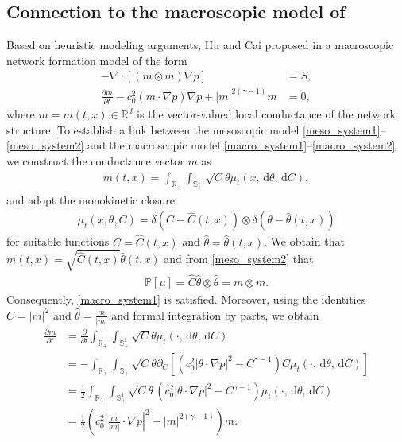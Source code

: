 \documentclass{article}
\numberwithin{equation}{section}
\def\[{\begin{eqnarray*}}
\def\]{\end{eqnarray*}}
\def\d{\,\mathrm{d}}
\begin{document}
\subsection{Connection to the macroscopic model of \cite{hu2013optimization}}
Based on heuristic modeling arguments, Hu and Cai proposed in \cite{hu2013optimization} a macroscopic network formation model of the form
\begin{align}
   -\nabla \cdot [(m\otimes m)\nabla p] &= S,\label{macro_system1}\\
   \frac{\partial m}{\partial t} - c_0^2 (m\cdot \nabla p)\nabla p + |m|^{2(\gamma-1)}m &= 0,\label{macro_system2}
\end{align}
where $m=m(t,x)\in \mathbb{R}^d$ is the vector-valued local conductance of the network structure.
To establish a link between the mesoscopic model \eqref{meso_system1}--\eqref{meso_system2}
and the macroscopic model \eqref{macro_system1}--\eqref{macro_system2} we construct the conductance vector $m$ as
\begin{align*}
   m(t,x) = \int_{\mathbb{R}_+}\int_{\mathbb{S}_+^1} \sqrt{C}\theta \mu_t(x,  \d\theta,\d C),
\end{align*}
and adopt the monokinetic closure
\begin{align*}
   \mu_t(x,\theta,C) = \delta(C-\hat{C}(t,x)) \otimes \delta(\theta-\hat{\theta}(t,x))
\end{align*}
for suitable functions $\hat{C}=\hat{C}(t,x)$ and $\hat{\theta}=\hat{\theta}(t,x)$.
We obtain that $m(t,x)=\sqrt{\hat{C}(t,x)}\hat{\theta}(t,x)$ and from \eqref{meso_system2} that
\[
    \mathbb{P}[\mu] =  \hat{C} \hat{\theta}\otimes\hat{\theta} = m\otimes m.
\]
Consequently, \eqref{macro_system1} is satisfied. 
Moreover, using the identities $\hat{C}=|m|^2$ and $\hat{\theta}=\frac{m}{|m|}$ and formal integration by parts, we obtain
\begin{align*}
   \frac{\partial m}{\partial t} &= \frac{\partial}{\partial t} \int_{\mathbb{R}_+}\int_{\mathbb{S}_+^1} \sqrt{C}\theta \mu_t(\cdot,  \d\theta, \d C)\\
   &=- \int_{\mathbb{R}_+}\int_{\mathbb{S}_+^1} \sqrt{C}\theta \partial_C \left[ (c_0^2 |\theta\cdot \nabla p|^2 -C^{\gamma-1}) C \mu_t(\cdot,  \d\theta, \d C) \right]\\
   &=\frac{1}{2} \int_{\mathbb{R}_+}\int_{\mathbb{S}_+^1} \sqrt{C}\theta \, (c_0^2 |\theta\cdot \nabla p|^2 -C^{\gamma-1}) \mu_t(\cdot,  \d\theta, \d C)\\
   &=\frac{1}{2} \left(c_0^2\left|\frac{m}{|m|}\cdot \nabla p\right|^2 - |m|^{2(\gamma-1)}\right) m.
\end{align*}
\end{document}
